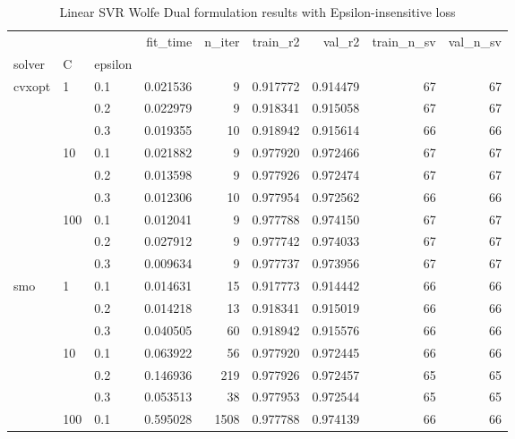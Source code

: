 \begin{table}[H]
\centering
\caption{Linear SVR Wolfe Dual formulation results with Epsilon-insensitive loss}
\label{linear_dual_svr_cv_results}
\begin{tabular}{lllrrrrrr}
\toprule
       &     &     &  fit\_time &  n\_iter &  train\_r2 &    val\_r2 &  train\_n\_sv &  val\_n\_sv \\
solver & C & epsilon &           &         &           &           &             &           \\
\midrule
cvxopt & 1   & 0.1 &  0.021536 &       9 &  0.917772 &  0.914479 &          67 &        67 \\
       &     & 0.2 &  0.022979 &       9 &  0.918341 &  0.915058 &          67 &        67 \\
       &     & 0.3 &  0.019355 &      10 &  0.918942 &  0.915614 &          66 &        66 \\
       & 10  & 0.1 &  0.021882 &       9 &  0.977920 &  0.972466 &          67 &        67 \\
       &     & 0.2 &  0.013598 &       9 &  0.977926 &  0.972474 &          67 &        67 \\
       &     & 0.3 &  0.012306 &      10 &  0.977954 &  0.972562 &          66 &        66 \\
       & 100 & 0.1 &  0.012041 &       9 &  0.977788 &  0.974150 &          67 &        67 \\
       &     & 0.2 &  0.027912 &       9 &  0.977742 &  0.974033 &          67 &        67 \\
       &     & 0.3 &  0.009634 &       9 &  0.977737 &  0.973956 &          67 &        67 \\
smo & 1   & 0.1 &  0.014631 &      15 &  0.917773 &  0.914442 &          66 &        66 \\
       &     & 0.2 &  0.014218 &      13 &  0.918341 &  0.915019 &          66 &        66 \\
       &     & 0.3 &  0.040505 &      60 &  0.918942 &  0.915576 &          66 &        66 \\
       & 10  & 0.1 &  0.063922 &      56 &  0.977920 &  0.972445 &          66 &        66 \\
       &     & 0.2 &  0.146936 &     219 &  0.977926 &  0.972457 &          65 &        65 \\
       &     & 0.3 &  0.053513 &      38 &  0.977953 &  0.972544 &          65 &        65 \\
       & 100 & 0.1 &  0.595028 &    1508 &  0.977788 &  0.974139 &          66 &        66 \\

\end{tabular}
\end{table}
